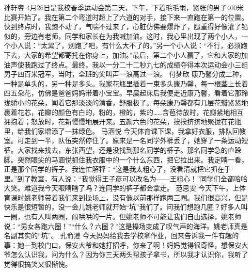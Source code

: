 {}\markdownRendererInterblockSeparator
{}孙轩睿\markdownRendererInterblockSeparator
{}4月26日是我校春季运动会第二天，下午，下着毛毛雨，紧张的男子400米比赛开始了。我在第二个弯道时超上了六道的对手，接下来一直跑在第一的位置。快到终点时，我跑不动了，气喘不过来了，心脏仿佛要爆炸了，腿重得好像灌了铅似的，旁边有老师，同学和家长在为我喊加油。这时，我心里出现了两个小人，一个小人说：“太累了，别跑了吧，有什么大不了的。”另一个小人说：“不行，必须跑下去，大家的希望都寄托在你身上，加油。”最后，第二个小人赢了，它和大家的加油声使我跑过了终点。最终，我以一分二十二秒九七的成绩夺得本次运动会小三组男子四百米冠军，当时，全班的尖叫声一浪高过一浪。\markdownRendererInterblockSeparator
{}\markdownRendererInterblockSeparator
{}付梦欣\markdownRendererInterblockSeparator
{}康乃馨分成二种，一种是单头的，另一种是多头。我家花瓶里插着一束多头康乃馨，每一根茎上长着四五朵花，仿佛是爸爸妈妈带着小宝宝。早晨起床后我便走近康乃馨，看着它那玲珑骄小的花朵，闻着它那淡淡的清香，舒服极了。每朵康乃馨都有几层花瓣紧紧地裹着花芯，花瓣的颜色有白的，粉的，橙的，紫的……含苞待放时，花瓣紧地相互拥抱着；怒放时，花新慢慢地展开来。五颜六色的花朵，挨挨挤挤地聚拢在花瓶里，给我们家增添了一抹绿色。\markdownRendererInterblockSeparator
{}\markdownRendererInterblockSeparator
{}马涵悦\markdownRendererInterblockSeparator
{}今天体育课下课，我拿好衣服，排队回教室。可走到一半，队伍突然停住了。原来是一名同学外裤丢了，她穿了一条运动短裤。大家找来找去，东张西望，还是没找到那名同学的裤子。那名同学急的直跺脚。突然眼尖的马涵悦抓住我衣服中的一个什么东西，把它拉出来。我定睛一看，正是那个同学的裤子。我连忙解释：“这是我太粗心了，没看清就把它抓在手里。”到了教室，有人说：“我觉得王子彦可以改名为——王粗心！”同学们全都哈哈大笑。难道我今天眼睛瞎了吗？连同学的裤子都会拿走。\markdownRendererInterblockSeparator
{}\markdownRendererInterblockSeparator
{}范思雯\markdownRendererInterblockSeparator
{}今天下午，上体育课时姚老师带着我们来到操场上，没有像以前那样跑两三圈。我们很高兴，但是快乐是很短暂的，没一会儿姚老师就开始“坑”我们了。问我们想跑几圈？好多人叫一圈，也有人叫两圈，闹哄哄的一片。但姚老师不可能让我们自由选择，姚老师说：“男女各跑六圈！”“什么？六圈？”这是操场变成了叹气声的海洋。姚老师真是名副其实的“坑”。\markdownRendererInterblockSeparator
{}\markdownRendererInterblockSeparator
{}孔俞澄\markdownRendererInterblockSeparator
{}今天妈妈给我去学校拿作业，回来告诉我一件有趣的事：她一到校门口，保安大爷和她打招呼，你来了啊！妈妈觉得很奇怪，想保安大爷怎么认识我，问为什么？因为你三天两头帮孩子拿书，所以我才认识你，我听了觉得很搞笑又很惭愧。\markdownRendererInterblockSeparator
